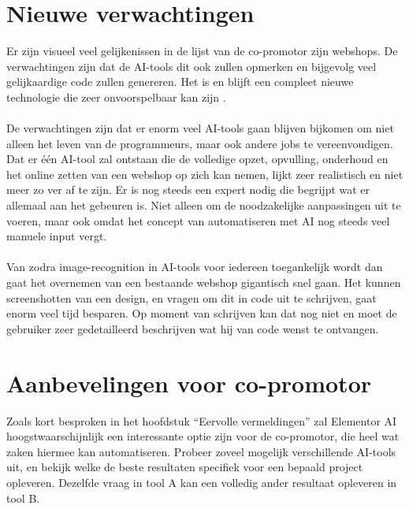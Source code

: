 \section{Nieuwe verwachtingen}
Er zijn visueel veel gelijkenissen in de lijst van de co-promotor zijn webshops. De verwachtingen zijn dat de AI-tools dit ook zullen opmerken en bijgevolg veel gelijkaardige code zullen genereren. Het is en blijft een compleet nieuwe technologie die zeer onvoorspelbaar kan zijn \autocite{KnorrEvans2023}.
\\\\
De verwachtingen zijn dat er enorm veel AI-tools gaan blijven bijkomen om niet alleen het leven van de programmeurs, maar ook andere jobs te vereenvoudigen. Dat er één AI-tool zal ontstaan die de volledige opzet, opvulling, onderhoud en het online zetten van een webshop op zich kan nemen, lijkt zeer realistisch en niet meer zo ver af te zijn. Er is nog steeds een expert nodig die begrijpt wat er allemaal aan het gebeuren is. Niet alleen om de noodzakelijke aanpassingen uit te voeren, maar ook omdat het concept van automatiseren met AI nog steeds veel manuele input vergt. 
\\\\
Van zodra image-recognition in AI-tools voor iedereen toegankelijk wordt dan gaat het overnemen van een bestaande webshop gigantisch snel gaan. Het kunnen screenshotten van een design, en vragen om dit in code uit te schrijven, gaat enorm veel tijd besparen. Op moment van schrijven kan dat nog niet en moet de gebruiker zeer gedetailleerd beschrijven wat hij van code wenst te ontvangen.
\section{Aanbevelingen voor co-promotor}
Zoals kort besproken in het hoofdstuk “Eervolle vermeldingen” zal Elementor AI hoogstwaarschijnlijk een interessante optie zijn voor de co-promotor, die heel wat zaken hiermee kan automatiseren. Probeer zoveel mogelijk verschillende AI-tools uit, en bekijk welke de beste resultaten specifiek voor een bepaald project opleveren. Dezelfde vraag in tool A kan een volledig ander resultaat opleveren in tool B. 

